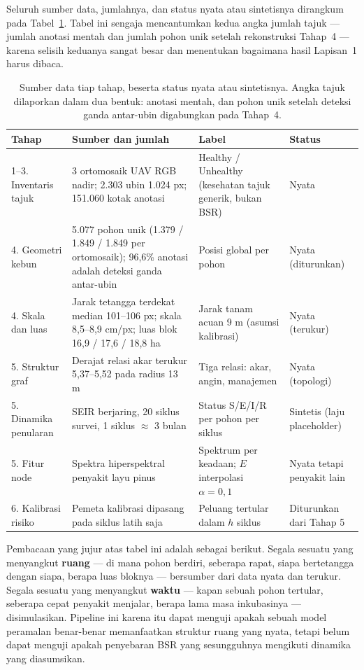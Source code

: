 Seluruh sumber data, jumlahnya, dan status nyata atau sintetisnya dirangkum pada
Tabel~\ref{tab:data}. Tabel ini sengaja mencantumkan kedua angka jumlah tajuk --- jumlah
anotasi mentah dan jumlah pohon unik setelah rekonstruksi Tahap~4 --- karena selisih
keduanya sangat besar dan menentukan bagaimana hasil Lapisan~1 harus dibaca.

\begin{table}[h]
\centering
\caption{Sumber data tiap tahap, beserta status nyata atau sintetisnya. Angka tajuk
dilaporkan dalam dua bentuk: anotasi mentah, dan pohon unik setelah deteksi ganda
antar-ubin digabungkan pada Tahap~4.}
\label{tab:data}
\begin{tabular}{llll}
\hline
\textbf{Tahap} & \textbf{Sumber dan jumlah} & \textbf{Label} & \textbf{Status} \\
\hline
1--3. Inventaris tajuk & 3 ortomosaik UAV RGB nadir; 2.303 ubin 1.024 px; 151.060 kotak anotasi & Healthy / Unhealthy (kesehatan tajuk generik, bukan BSR) & Nyata \\
4. Geometri kebun & 5.077 pohon unik (1.379 / 1.849 / 1.849 per ortomosaik); 96,6\% anotasi adalah deteksi ganda antar-ubin & Posisi global per pohon & Nyata (diturunkan) \\
4. Skala dan luas & Jarak tetangga terdekat median 101--106 px; skala 8,5--8,9 cm/px; luas blok 16,9 / 17,6 / 18,8 ha & Jarak tanam acuan 9 m (asumsi kalibrasi) & Nyata (terukur) \\
5. Struktur graf & Derajat relasi akar terukur 5,37--5,52 pada radius 13 m & Tiga relasi: akar, angin, manajemen & Nyata (topologi) \\
5. Dinamika penularan & SEIR berjaring, 20 siklus survei, 1 siklus $\approx$ 3 bulan & Status S/E/I/R per pohon per siklus & Sintetis (laju placeholder) \\
5. Fitur node & Spektra hiperspektral penyakit layu pinus & Spektrum per keadaan; $E$ interpolasi $\alpha = 0,1$ & Nyata tetapi penyakit lain \\
6. Kalibrasi risiko & Pemeta kalibrasi dipasang pada siklus latih saja & Peluang tertular dalam $h$ siklus & Diturunkan dari Tahap 5 \\
\hline
\end{tabular}
\end{table}

Pembacaan yang jujur atas tabel ini adalah sebagai berikut. Segala sesuatu yang menyangkut
\textbf{ruang} --- di mana pohon berdiri, seberapa rapat, siapa bertetangga dengan siapa,
berapa luas bloknya --- bersumber dari data nyata dan terukur. Segala sesuatu yang
menyangkut \textbf{waktu} --- kapan sebuah pohon tertular, seberapa cepat penyakit
menjalar, berapa lama masa inkubasinya --- disimulasikan. Pipeline ini karena itu dapat
menguji apakah sebuah model peramalan benar-benar memanfaatkan struktur ruang yang nyata,
tetapi belum dapat menguji apakah penyebaran BSR yang sesungguhnya mengikuti dinamika yang
diasumsikan.

